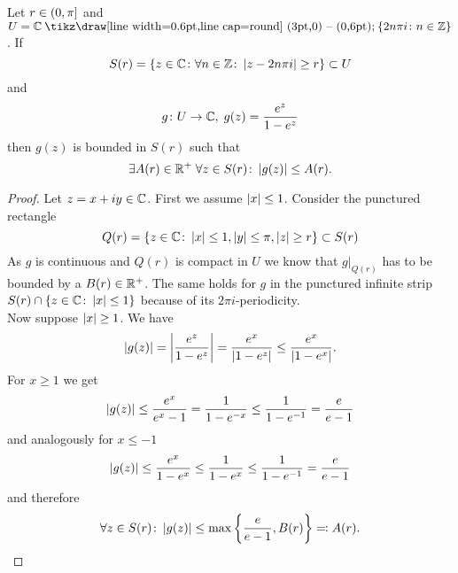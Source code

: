 \begin{lemma}
	Let $r \in \left(0, \pi\right]$ and $U = \field{C} \mysetminus \fbr{2 n \pi i \colon n \in \field{Z}}$. If
\begin{equation*}
	S(r) = \left\{z \in \mathbb{C} \colon \forall n \in \mathbb{Z} \colon \left|z - 2 n \pi i\right| \geq r\right\} \subset U
\end{equation*}
	and
\begin{equation*}
	g \colon U \to \mathbb{C}, \; g(z) = \frac{e^z}{1 - e^z}
\end{equation*}
	then $g(z)$ is bounded in $S(r)$ such that
\begin{equation*}
	\exists A(r) \in \mathbb{R}^+ \; \forall z \in S(r) \colon \left|g(z)\right| \leq A(r).
\end{equation*}
\end{lemma}
\begin{proof}
	Let $z = x + i y \in \mathbb{C}$. First we assume $\left|x\right| \leq 1$. Consider the punctured rectangle
\begin{equation*}
	Q(r) = \left\{z \in \mathbb{C} \colon \left|x\right| \leq 1, \left|y\right| \leq \pi, \left|z\right| \geq r\right\} \subset S(r)
\end{equation*}
	As $g$ is continuous and $Q(r)$ is compact in $U$ we know that $g \big\vert _{Q(r)}$ has to be bounded by a $B(r) \in \mathbb{R}^+$. The same holds for $g$ in the punctured infinite strip $S(r) \cap \left\{z \in \mathbb{C} \colon \left|x\right| \leq 1\right\}$ because of its $2 \pi i$-periodicity. \\
	Now suppose $\left|x\right| \geq 1$. We have
\begin{equation*}
	\left|g(z)\right| = \left|\frac{e^z}{1 - e^z}\right| = \frac{e^x}{\left|1 - e^z\right|} \leq \frac{e^x}{\left|1 - e^x\right|}.
\end{equation*}
	For $x \geq 1$ we get
\begin{equation*}
	\left|g(z)\right| \leq \frac{e^x}{e^x - 1} = \frac{1}{1 - e^{-x}} \leq \frac{1}{1 - e^{-1}} = \frac{e}{e - 1}
\end{equation*}
	and analogously for $x \leq -1$ 
\begin{equation*}
	\left|g(z)\right| \leq \frac{e^x}{1 - e^x} \leq \frac{1}{1 - e^x} \leq \frac{1}{1 - e^{-1}} = \frac{e}{e - 1}
\end{equation*}
	and therefore
\begin{equation*}
	\forall z \in S(r) \colon \left|g(z)\right| \leq \max \left\{\frac{e}{e - 1}, B(r)\right\} \eqqcolon A(r).
\end{equation*}
\end{proof}


